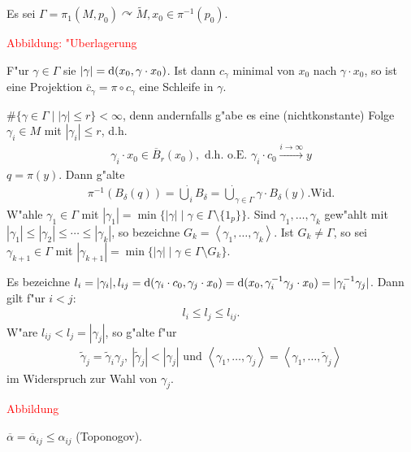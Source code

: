 \begin{emptythm}[Beweisskizze]
  Es sei $\Gamma = \pi_1(M,p_0) \curvearrowright \tilde M, x_0 \in \pi^{-1}(p_0)$.
  \begin{center}
    \textcolor{red}{Abbildung: "Uberlagerung}
  \end{center}
  F"ur $\gamma \in \Gamma$ sie $|\gamma| = \mathrm{d}(x_0, \gamma \cdot x_0)$.
  Ist dann $c_{\gamma}$ minimal von $x_0$ nach $\gamma \cdot x_0$, so ist eine Projektion $\overline c_{\gamma} = \pi \circ c_{\gamma}$ eine Schleife in $\gamma$.

  $\#\{\gamma \in \Gamma \mid | \gamma | \leq r \} < \infty$, denn andernfalls g"abe es eine (nichtkonstante) Folge $\gamma_i \in M$ mit $|\gamma_i| \leq r$, d.h. 
  \begin{align*}
    \gamma_i \cdot x_0 \in \overline B_r(x_0),
    \text{ d.h. o.E. } \gamma_i \cdot c_0 \xrightarrow{i \to \infty} y
  \end{align*}
  $q = \pi(y)$. Dann g"alte
  \begin{align*}
    \pi^{-1}(B_{\delta}(q)) = \dot \bigcup_i B_{\delta}
    = \dot \bigcup_{\gamma \in \Gamma} \gamma \cdot B_{\delta}(y). \text{Wid.}
  \end{align*}
  W"ahle $\gamma_1 \in \Gamma$ mit $|\gamma_1| = \min \{ |\gamma| \mid \gamma \in \Gamma \setminus \{1_p\} \}$.
  Sind $\gamma_1, \ldots, \gamma_k$ gew"ahlt mit $|\gamma_1| \leq |\gamma_2| \leq \cdots \leq |\gamma_k|$, so bezeichne $G_k = \left< \gamma_1, \ldots, \gamma_k\right>$.
  Ist $G_k \neq \Gamma$, so sei $\gamma_{k+1} \in \Gamma$ mit $|\gamma_{k+1}| = \min \{ |\gamma| \mid \gamma \in \Gamma \setminus G_k\}$.

  Es bezeichne $l_i = |\gamma_i|, l_{ij} = \mathrm{d}(\gamma_i \cdot c_0, \gamma_j\cdot x_0) = \mathrm{d}(x_0, \gamma_i^{-1}\gamma_j \cdot x_0) = |\gamma_i^{-1}\gamma_j|$.
  Dann gilt f"ur $i < j$:
  \begin{align*}
    l_i \leq l_j \leq l_{ij}.
  \end{align*}
  W"are $l_{ij} < l_j = |\gamma_j|$, so g"alte f"ur
  \begin{align*}
    \tilde \gamma_j = \tilde \gamma_i \gamma_j, \ |\tilde\gamma_j| < |\gamma_j| \text{ und }
    \left<\gamma_1, \ldots, \gamma_j\right> = \left<\gamma_1, \ldots, \tilde \gamma_j\right>
  \end{align*}
  im Widerspruch zur Wahl von $\gamma_j$.

  \begin{center}
    \textcolor{red}{Abbildung}
  \end{center}
  $\overline \alpha = \overline \alpha_{ij} \leq \alpha_{ij}$ (Toponogov).


\end{emptythm}
